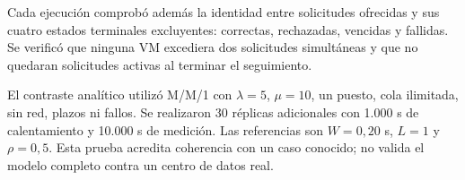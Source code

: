 Cada ejecución comprobó además la identidad entre solicitudes ofrecidas y sus cuatro estados terminales excluyentes: correctas, rechazadas, vencidas y fallidas. Se verificó que ninguna VM excediera dos solicitudes simultáneas y que no quedaran solicitudes activas al terminar el seguimiento.

El contraste analítico utilizó M/M/1 con $\lambda=5$, $\mu=10$, un puesto, cola ilimitada, sin red, plazos ni fallos. Se realizaron 30 réplicas adicionales con 1.000 s de calentamiento y 10.000 s de medición. Las referencias son $W=0,20$ s, $L=1$ y $\rho=0,5$. Esta prueba acredita coherencia con un caso conocido; no valida el modelo completo contra un centro de datos real.
